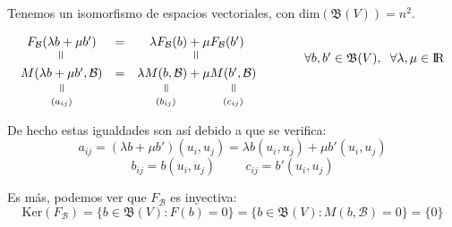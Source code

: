 \documentclass[10pt, a4paper]{article}
\makeatletter
\newcommand{\verteq}{\rotatebox{90}{$\,=$}}
\newcommand{\equalto}[2]{\underset{\scriptstyle\overset{\mkern4mu\verteq}{#2}}{#1}}
\renewenvironment{proof}[1][\proofname] {\par\pushQED{\qed}\normalfont\topsep6\p@\@plus6\p@\relax\trivlist\item[\hskip\labelsep\itshape\sffamily#1\@addpunct{.}]\ignorespaces}{\popQED\endtrivlist\@endpefalse}
\theoremstyle{theorem-style}
\theoremstyle{definition-style}
\theoremstyle{remark-style}
\theoremstyle{example-style}
\theoremstyle{definition-style}
\theoremstyle{remark-style}
\makeatother
\begin{document}
Tenemos un isomorfismo de espacios vectoriales, con $\text{dim}(\mathfrak{B}(V))=n^2$.
\begin{proof}
$$ \begin{matrix} F_\mathcal{B}(\lambda b + \mu b') & = & \lambda F_\mathcal{B}(b) + \mu F_\mathcal{B}(b') & \\ \rotatebox{90}{$\,=$} & & \rotatebox{90}{$\,=$} & \hspace{1cm}\forall b,b' \in \mathfrak{B}(V), \hspace{2mm} \forall \lambda, \mu \in \rm I\!R \\ \equalto{M(\lambda b + \mu b', \mathcal{B})}{(a_{ij})} & = & \lambda \equalto{M(b, \mathcal{B})}{(b_{ij})} + \mu \equalto{M(b', \mathcal{B})}{(c_{ij})} \end{matrix} $$

De hecho estas igualdades son así debido a que se verifica:
$$a_{ij}=(\lambda b + \mu b' )(u_i, u_j)=\lambda b(u_i,u_j) + \mu b'(u_i,u_j)$$
$$ b_{ij} = b(u_i,u_j)\hspace{1cm} c_{ij} = b'(u_i,u_j)$$
\end{proof}

Es más, podemos ver que $F_\mathcal{B}$ es inyectiva:
$$ \text{Ker}(F_\mathcal{B})=\{b \in \mathfrak{B}(V) : F(b) = 0 \} = \{b \in \mathfrak{B}(V) : M(b, \mathcal{B}) = 0 \} = \{0\}$$
\end{document}
